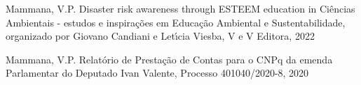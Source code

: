 \documentclass[
12pt,		%
openright,	%
twoside,  %
a4paper,			%
chapter=TITLE,		%
english,			%
french,				%
spanish,			%
brazil				%
]{USPSC-classe/USPSC}
\begin{document}
\begin{flushleft}
\begin{flushleft}
\begin{flushleft}
\begin{flushleft}
\begin{flushleft}
\begin{flushleft}
\begin{flushleft}
\begin{flushleft}
[MAMMANA et al., 2022a] Mammana, V.P. Disaster risk awareness through ESTEEM education in Ci\^encias Ambientais - estudos e inspira\c{c}\~oes em Educa\c{c}\~ao Ambiental e Sustentabilidade, organizado por Giovano Candiani e Let\'{\i}cia Viesba, V e V Editora, 2022
\end{flushleft}


\end{flushleft}


\end{flushleft}


\end{flushleft}


\end{flushleft}


\end{flushleft}


\end{flushleft}


\end{flushleft}


\begin{flushleft}
\begin{flushleft}
\begin{flushleft}
\begin{flushleft}
\begin{flushleft}
\begin{flushleft}
\begin{flushleft}
\begin{flushleft}
[CNPq, 2020b] Mammana, V.P. Relat\'orio de Presta\c{c}\~ao de Contas para o CNPq da emenda Parlamentar do Deputado Ivan Valente, Processo 401040/2020-8, 2020
\end{flushleft}


\end{flushleft}


\end{flushleft}


\end{flushleft}


\end{flushleft}


\end{flushleft}


\end{flushleft}


\end{flushleft}
\end{document}
